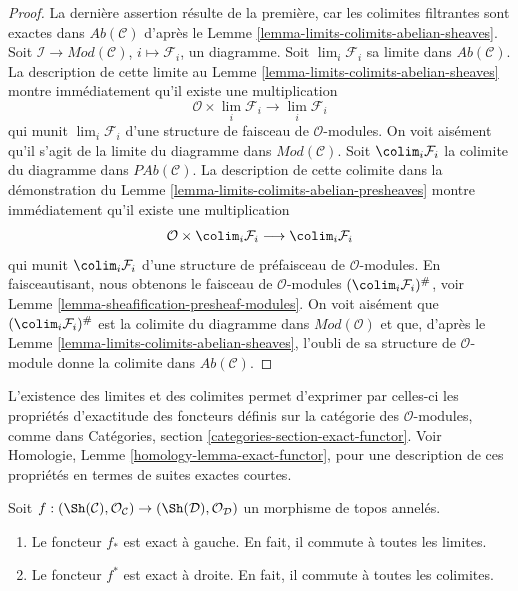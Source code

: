 \begin{proof}
La dernière assertion résulte de la première, car les colimites filtrantes sont
exactes dans $\textit{Ab}(\mathcal{C})$ d'après le Lemme
\ref{lemma-limits-colimits-abelian-sheaves}. Soit
$\mathcal{I} \to \textit{Mod}(\mathcal{C})$, $i \mapsto \mathcal{F}_i$, un
diagramme. Soit $\lim_i \mathcal{F}_i$ sa limite dans
$\textit{Ab}(\mathcal{C})$. La description de cette limite au Lemme
\ref{lemma-limits-colimits-abelian-sheaves} montre immédiatement qu'il existe
une multiplication
$$
\mathcal{O} \times \lim_i \mathcal{F}_i
\longrightarrow
\lim_i \mathcal{F}_i
$$
qui munit $\lim_i \mathcal{F}_i$ d'une structure de faisceau de
$\mathcal{O}$-modules. On voit aisément qu'il s'agit de la limite du diagramme
dans $\textit{Mod}(\mathcal{C})$. Soit $\colim_i \mathcal{F}_i$ la colimite du
diagramme dans $\textit{PAb}(\mathcal{C})$. La description de cette colimite
dans la démonstration du Lemme
\ref{lemma-limits-colimits-abelian-presheaves} montre immédiatement qu'il
existe une multiplication
$$
\mathcal{O} \times \colim_i \mathcal{F}_i
\longrightarrow
\colim_i \mathcal{F}_i
$$
qui munit $\colim_i \mathcal{F}_i$ d'une structure de préfaisceau de
$\mathcal{O}$-modules. En faisceautisant, nous obtenons le faisceau de
$\mathcal{O}$-modules $(\colim_i \mathcal{F}_i)^\#$, voir Lemme
\ref{lemma-sheafification-presheaf-modules}. On voit aisément que
$(\colim_i \mathcal{F}_i)^\#$ est la colimite du diagramme dans
$\textit{Mod}(\mathcal{O})$ et que, d'après le Lemme
\ref{lemma-limits-colimits-abelian-sheaves}, l'oubli de sa structure de
$\mathcal{O}$-module donne la colimite dans $\textit{Ab}(\mathcal{C})$.
\end{proof}

\noindent
L'existence des limites et des colimites permet d'exprimer par celles-ci les
propriétés d'exactitude des foncteurs définis sur la catégorie des
$\mathcal{O}$-modules, comme dans Catégories, section
\ref{categories-section-exact-functor}. Voir Homologie, Lemme
\ref{homology-lemma-exact-functor}, pour une description de ces propriétés en
termes de suites exactes courtes.

\begin{lemma}
\label{lemma-exactness-pushforward-pullback}
Soit $f : (\Sh(\mathcal{C}), \mathcal{O}_\mathcal{C})
\to (\Sh(\mathcal{D}), \mathcal{O}_\mathcal{D})$
un morphisme de topos annelés.
\begin{enumerate}
\item Le foncteur $f_*$ est exact à gauche. En fait, il commute à toutes les
limites.
\item Le foncteur $f^*$ est exact à droite. En fait, il commute à toutes les
colimites.
\end{enumerate}
\end{lemma}

